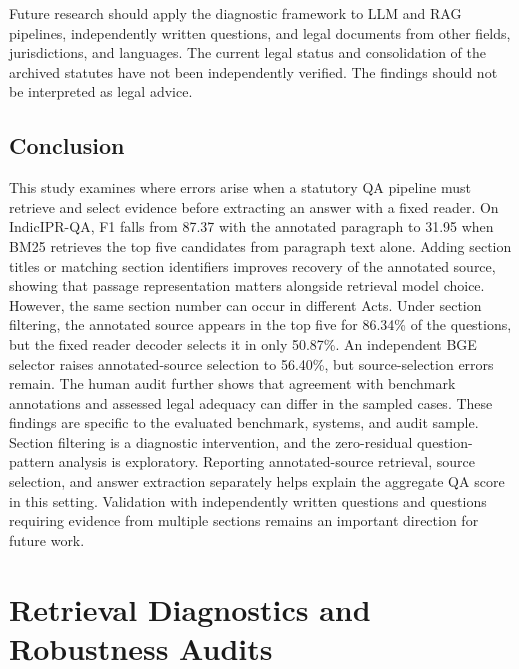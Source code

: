\documentclass[pdflatex,sn-basic]{sn-jnl}%
\theoremstyle{thmstyleone}%
\theoremstyle{thmstyletwo}%
\theoremstyle{thmstylethree}%
\begin{document}
Future research should apply the diagnostic framework to LLM and RAG
pipelines, independently written questions, and legal documents from other
fields, jurisdictions, and languages. The current legal status and
consolidation of the archived statutes have not been independently verified.
The findings should not be interpreted as legal advice.

\FloatBarrier


\begin{samepage}
\section{Conclusion}
\label{sec:conclusion}

This study examines where errors arise when a statutory QA pipeline must retrieve and select evidence before extracting an answer with a fixed reader. On IndicIPR-QA, F1 falls from 87.37 with the annotated paragraph to 31.95 when BM25 retrieves the top five candidates from paragraph text alone. Adding section titles or matching section identifiers improves recovery of the annotated source, showing that passage representation matters alongside retrieval model choice. However, the same section number can occur in different Acts. Under section filtering, the annotated source appears in the top five for 86.34\% of the questions, but the fixed reader decoder selects it in only 50.87\%. An independent BGE selector raises annotated-source selection to 56.40\%, but source-selection errors remain. The human audit further shows that agreement with benchmark annotations and assessed legal adequacy can differ in the sampled cases. These findings are specific to the evaluated benchmark, systems, and audit sample. Section filtering is a diagnostic intervention, and the zero-residual question-pattern analysis is exploratory. Reporting annotated-source retrieval, source selection, and answer extraction separately helps explain the aggregate QA score in this setting. Validation with independently written questions and questions requiring evidence from multiple sections remains an important direction for future work.
\end{samepage}

\clearpage


\appendix
\section{Retrieval Diagnostics and Robustness Audits}
\label{app:secondary}
\end{document}

